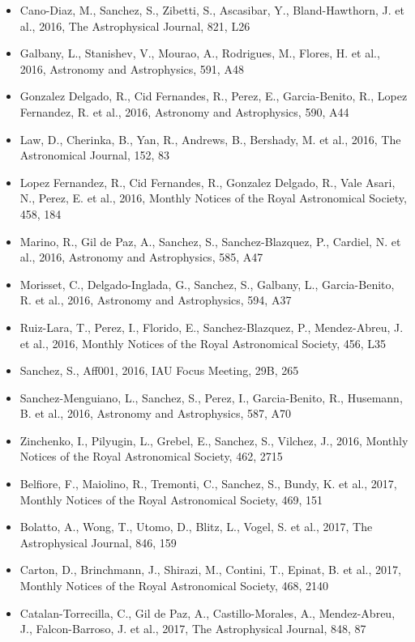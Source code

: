 \documentclass{letter}
\begin{document}
\begin{enumerate}
\begin{itemize}
\item Cano-Diaz, M., Sanchez, S., Zibetti, S., Ascasibar, Y., Bland-Hawthorn, J. et al., 2016, The Astrophysical Journal, 821, L26
\item Galbany, L., Stanishev, V., Mourao, A., Rodrigues, M., Flores, H. et al., 2016, Astronomy and Astrophysics, 591, A48
\item Gonzalez Delgado, R., Cid Fernandes, R., Perez, E., Garcia-Benito, R., Lopez Fernandez, R. et al., 2016, Astronomy and Astrophysics, 590, A44
\item Law, D., Cherinka, B., Yan, R., Andrews, B., Bershady, M. et al., 2016, The Astronomical Journal, 152, 83
\item Lopez Fernandez, R., Cid Fernandes, R., Gonzalez Delgado, R., Vale Asari, N., Perez, E. et al., 2016, Monthly Notices of the Royal Astronomical Society, 458, 184
\item Marino, R., Gil de Paz, A., Sanchez, S., Sanchez-Blazquez, P., Cardiel, N. et al., 2016, Astronomy and Astrophysics, 585, A47
\item Morisset, C., Delgado-Inglada, G., Sanchez, S., Galbany, L., Garcia-Benito, R. et al., 2016, Astronomy and Astrophysics, 594, A37
\item Ruiz-Lara, T., Perez, I., Florido, E., Sanchez-Blazquez, P., Mendez-Abreu, J. et al., 2016, Monthly Notices of the Royal Astronomical Society, 456, L35
\item Sanchez, S., Aff001, 2016, IAU Focus Meeting, 29B, 265
\item Sanchez-Menguiano, L., Sanchez, S., Perez, I., Garcia-Benito, R., Husemann, B. et al., 2016, Astronomy and Astrophysics, 587, A70
\item Zinchenko, I., Pilyugin, L., Grebel, E., Sanchez, S., Vilchez, J., 2016, Monthly Notices of the Royal Astronomical Society, 462, 2715
\item Belfiore, F., Maiolino, R., Tremonti, C., Sanchez, S., Bundy, K. et al., 2017, Monthly Notices of the Royal Astronomical Society, 469, 151
\item Bolatto, A., Wong, T., Utomo, D., Blitz, L., Vogel, S. et al., 2017, The Astrophysical Journal, 846, 159
\item Carton, D., Brinchmann, J., Shirazi, M., Contini, T., Epinat, B. et al., 2017, Monthly Notices of the Royal Astronomical Society, 468, 2140
\item Catalan-Torrecilla, C., Gil de Paz, A., Castillo-Morales, A., Mendez-Abreu, J., Falcon-Barroso, J. et al., 2017, The Astrophysical Journal, 848, 87

\end{itemize}
\end{enumerate}
\end{document}

